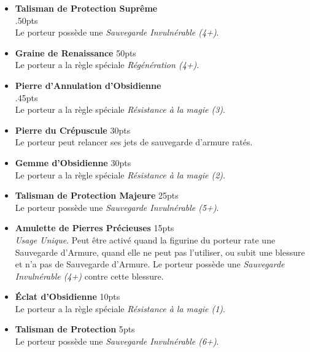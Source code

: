 \begin{multicols}{2}
\begin{itemize}[label={-}]
\item \textbf{Talisman de Protection Suprême} \\ .\dotfill \unit{50}{pts} \\
Le porteur possède une \emph{Sauvegarde Invulnérable (4+)}.

\item \textbf{Graine de Renaissance} \dotfill \unit{50}{pts} \\
Le porteur a la règle spéciale \emph{Régénération (4+)}.

\item \textbf{Pierre d'Annulation d'Obsidienne} \\ .\dotfill \unit{45}{pts} \\
Le porteur a la règle spéciale \emph{Résistance à la magie (3)}.

\item \textbf{Pierre du Crépuscule} \dotfill \unit{30}{pts} \\
Le porteur peut relancer ses jets de sauvegarde d'armure ratés.

\item \textbf{Gemme d'Obsidienne} \dotfill \unit{30}{pts} \\
Le porteur a la règle spéciale \emph{Résistance à la magie (2)}.

\item \textbf{Talisman de Protection Majeure} \dotfill \unit{25}{pts} \\
Le porteur possède une \emph{Sauvegarde Invulnérable (5+)}.

\bigskip\medskip
\item \textbf{Amulette de Pierres Précieuses} \dotfill \unit{15}{pts} \\
\emph{Usage Unique}. Peut être activé quand la figurine du porteur rate une Sauvegarde d'Armure, quand elle ne peut pas l'utiliser, ou subit une blessure et n'a pas de Sauvegarde d'Armure. Le porteur possède une \emph{Sauvegarde Invulnérable (4+)} contre cette blessure.

\item \textbf{Éclat d'Obsidienne} \dotfill \unit{10}{pts} \\
Le porteur a la règle spéciale \emph{Résistance à la magie (1)}.

\item \textbf{Talisman de Protection} \dotfill \unit{5}{pts} \\
Le porteur possède une \emph{Sauvegarde Invulnérable (6+)}.


\end{itemize}
\end{multicols}
